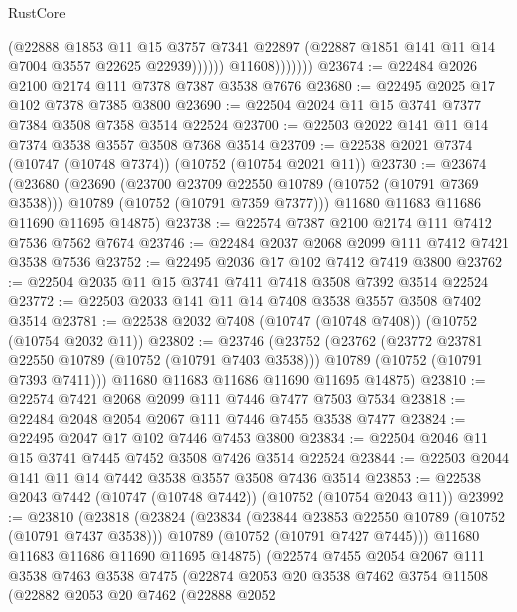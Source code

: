 \begin{lexlean}{RustCore}
\begin{coremodule}
                          (@22888
                            @1853
                            @11
                            @15
                            @3757
                            @7341
                            @22897
                            (@22887 @1851 @141 @11 @14 @7004 @3557 @22625 @22939))))))
                  @11608)))))))
@23674 := @22484 @2026 @2100 @2174 @111 @7378 @7387 @3538 @7676
@23680 := @22495 @2025 @17 @102 @7378 @7385 @3800
@23690 := @22504 @2024 @11 @15 @3741 @7377 @7384 @3508 @7358 @3514 @22524
@23700 := @22503 @2022 @141 @11 @14 @7374 @3538 @3557 @3508 @7368 @3514
@23709 := @22538 @2021 @7374 (@10747 (@10748 @7374)) (@10752 (@10754 @2021 @11))
@23730 := @23674
    (@23680
      (@23690
        (@23700 @23709 @22550 @10789 (@10752 (@10791 @7369 @3538)))
        @10789
        (@10752 (@10791 @7359 @7377)))
      @11680
      @11683
      @11686
      @11690
      @11695
      @14875)
@23738 := @22574 @7387 @2100 @2174 @111 @7412 @7536 @7562 @7674
@23746 := @22484 @2037 @2068 @2099 @111 @7412 @7421 @3538 @7536
@23752 := @22495 @2036 @17 @102 @7412 @7419 @3800
@23762 := @22504 @2035 @11 @15 @3741 @7411 @7418 @3508 @7392 @3514 @22524
@23772 := @22503 @2033 @141 @11 @14 @7408 @3538 @3557 @3508 @7402 @3514
@23781 := @22538 @2032 @7408 (@10747 (@10748 @7408)) (@10752 (@10754 @2032 @11))
@23802 := @23746
    (@23752
      (@23762
        (@23772 @23781 @22550 @10789 (@10752 (@10791 @7403 @3538)))
        @10789
        (@10752 (@10791 @7393 @7411)))
      @11680
      @11683
      @11686
      @11690
      @11695
      @14875)
@23810 := @22574 @7421 @2068 @2099 @111 @7446 @7477 @7503 @7534
@23818 := @22484 @2048 @2054 @2067 @111 @7446 @7455 @3538 @7477
@23824 := @22495 @2047 @17 @102 @7446 @7453 @3800
@23834 := @22504 @2046 @11 @15 @3741 @7445 @7452 @3508 @7426 @3514 @22524
@23844 := @22503 @2044 @141 @11 @14 @7442 @3538 @3557 @3508 @7436 @3514
@23853 := @22538 @2043 @7442 (@10747 (@10748 @7442)) (@10752 (@10754 @2043 @11))
@23992 := @23810
    (@23818
      (@23824
        (@23834
          (@23844 @23853 @22550 @10789 (@10752 (@10791 @7437 @3538)))
          @10789
          (@10752 (@10791 @7427 @7445)))
        @11680
        @11683
        @11686
        @11690
        @11695
        @14875)
      (@22574
        @7455
        @2054
        @2067
        @111
        @3538
        @7463
        @3538
        @7475
        (@22874
          @2053
          @20
          @3538
          @7462
          @3754
          @11508
          (@22882
            @2053
            @20
            @7462
            (@22888
              @2052

\end{coremodule}
\end{lexlean}
